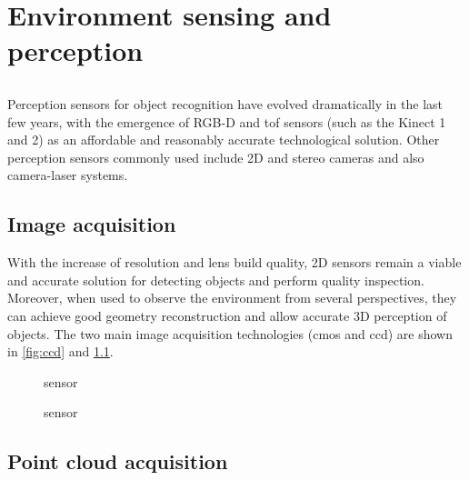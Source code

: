 \chapter{Environment sensing and perception}\label{chap:environment-sensing-and-perception}

\section*{}

Perception sensors for object recognition have evolved dramatically in the last few years, with the emergence of RGB-D and \gls{tof} sensors (such as the Kinect 1 and 2) as an affordable and reasonably accurate technological solution. Other perception sensors commonly used include 2D and stereo cameras and also camera-laser systems.

\section{Image acquisition}\label{sec:image-acquisition}

With the increase of resolution and lens build quality, 2D sensors remain a viable and accurate solution for detecting objects and perform quality inspection. Moreover, when used to observe the environment from several perspectives, they can achieve good geometry reconstruction and allow accurate 3D perception of objects. The two main image acquisition technologies (\gls{cmos} and \gls{ccd}) are shown in \cref{fig:ccd} and \cref{fig:cmos}.


\begin{figure}[H]
	\begin{floatrow}[2]
		{\caption[ sensor]{ sensor\protect\footnotemark}\label{fig:ccd}}

		{\caption[ sensor]{ sensor\protect\footnotemark}\label{fig:cmos}}
	\end{floatrow}
\end{figure}


\section{Point cloud acquisition}\label{sec:point-cloud-acquisition}


